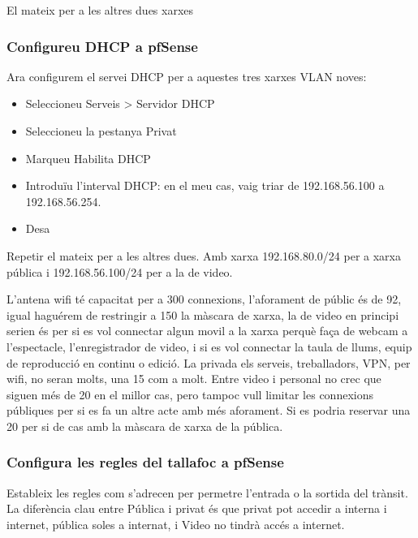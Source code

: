 \documentclass[
  10pt,
]{krantz}
\providecommand{\tightlist}{%
  \setlength{\itemsep}{0pt}\setlength{\parskip}{0pt}}
\begin{document}
El mateix per a les altres dues xarxes

\hypertarget{configureu-dhcp-a-pfsense}{%
\subsubsection{Configureu DHCP a pfSense}\label{configureu-dhcp-a-pfsense}}

Ara configurem el servei DHCP per a aquestes tres xarxes VLAN noves:

\begin{itemize}
\tightlist
\item
  Seleccioneu Serveis \textgreater{} Servidor DHCP
\item
  Seleccioneu la pestanya Privat
\item
  Marqueu Habilita DHCP
\item
  Introduïu l'interval DHCP: en el meu cas, vaig triar de 192.168.56.100 a 192.168.56.254.
\item
  Desa
\end{itemize}

Repetir el mateix per a les altres dues. Amb xarxa 192.168.80.0/24 per a xarxa pública i 192.168.56.100/24 per a la de video.

L'antena wifi té capacitat per a 300 connexions, l'aforament de públic és de 92, igual haguérem de restringir a 150 la màscara de xarxa, la de video en principi serien és per si es vol connectar algun movil a la xarxa perquè faça de webcam a l'espectacle, l'enregistrador de video, i si es vol connectar la taula de llums, equip de reproducció en continu o edició. La privada els serveis, treballadors, VPN, per wifi, no seran molts, una 15 com a molt. Entre video i personal no crec que siguen més de 20 en el millor cas, pero tampoc vull limitar les connexions públiques per si es fa un altre acte amb més aforament. Si es podria reservar una 20 per si de cas amb la màscara de xarxa de la pública.

\hypertarget{configura-les-regles-del-tallafoc-a-pfsense}{%
\subsubsection{Configura les regles del tallafoc a pfSense}\label{configura-les-regles-del-tallafoc-a-pfsense}}

Estableix les regles com s'adrecen per permetre l'entrada o la sortida del trànsit. La diferència clau entre Pública i privat és que privat pot accedir a interna i internet, pública soles a internat, i Video no tindrà accés a internet.
\end{document}
